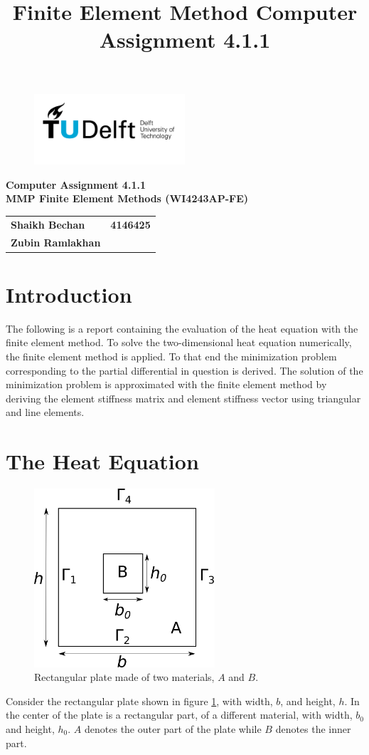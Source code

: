 \documentclass[10pt,a4paper]{article}
\title{Finite Element Method Computer Assignment 4.1.1}
\begin{document}
\begin{figure}[t]
	\centering
	\includegraphics[width=0.5\textwidth]{TU_d_line_P1_color_1.jpg}
\end{figure}

\begin{center}
	\textbf{Computer Assignment 4.1.1}\\
	\textbf{MMP Finite Element Methods (WI4243AP-FE)}
	\begin{tabular}{lr}
		\textbf{Shaikh Bechan} & \textbf{4146425}\\
		\textbf{Zubin Ramlakhan} & \\
	\end{tabular}
\end{center}

\section{Introduction}
The following is a report containing the evaluation of the heat equation with the finite element method.
To solve the two-dimensional heat equation numerically, the finite element method is applied. To that end the minimization problem corresponding to the partial differential in question is derived. The solution of the minimization problem is approximated with the finite element method by deriving the element stiffness matrix and element stiffness vector using triangular and line elements.

\section{The Heat Equation}
	\begin{figure}[h]
		\centering
		\includegraphics[width=0.6\textwidth]{schem.png}
		\caption{Rectangular plate made of two materials, $A$ and $B$.}
		\label{fig:schem}
	\end{figure}
Consider the rectangular plate shown in figure \ref{fig:schem}, with width, $b$, and height, $h$. In the center of the plate is a rectangular part, of a different material, with width, $b_0$ and height, $h_0$. $A$ denotes the outer part of the plate while $B$ denotes the inner part.
\end{document}
